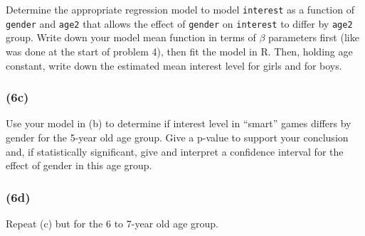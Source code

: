 \documentclass[
]{article}
\begin{document}
Determine the appropriate regression model to model \texttt{interest} as
a function of \texttt{gender} and \texttt{age2} that allows the effect
of \texttt{gender} on \texttt{interest} to differ by \texttt{age2}
group. Write down your model mean function in terms of \(\beta\)
parameters first (like was done at the start of problem 4), then fit the
model in R. Then, holding age constant, write down the estimated mean
interest level for girls and for boys.

\hypertarget{c-2}{%
\subsubsection{(6c)}\label{c-2}}

Use your model in (b) to determine if interest level in ``smart'' games
differs by gender for the 5-year old age group. Give a p-value to
support your conclusion and, if statistically significant, give and
interpret a confidence interval for the effect of gender in this age
group.

\hypertarget{d-2}{%
\subsubsection{(6d)}\label{d-2}}

Repeat (c) but for the 6 to 7-year old age group.
\end{document}
